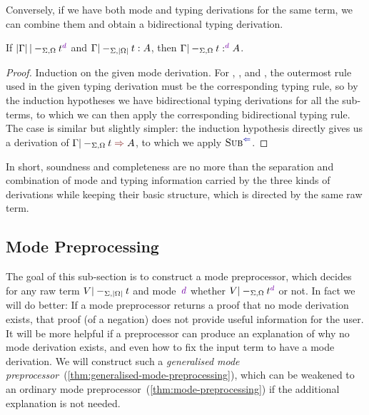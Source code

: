 Conversely, if we have both mode and typing derivations for the same term, we can combine them and obtain a bidirectional typing derivation.

\begin{lemma}[Completeness]\label{thm:completeness}
If\/ $\erase\Gamma |-_{\Sigma, \Omega} t^\dir{d}$ and\/ $\Gamma |-_{\Sigma, \left|\Omega\right|} t : A$, then $\Gamma |-_{\Sigma, \Omega} t :^\dir{d} A$.
\end{lemma}

\begin{proof}
Induction on the given mode derivation.
For , , and , the outermost rule used in the given typing derivation must be the corresponding typing rule, so by the induction hypotheses we have bidirectional typing derivations for all the sub-terms, to which we can then apply the corresponding bidirectional typing rule.
The  case is similar but slightly simpler: the induction hypothesis directly gives us a derivation of $\Gamma |-_{\Sigma,\Omega} t \syn A$, to which we apply $\ChkRule{Sub}$.
\end{proof}

In short, soundness and completeness are no more than the separation and combination of mode and typing information carried by the three kinds of derivations while keeping their basic structure, which is directed by the same raw term.

\subsection{Mode Preprocessing}
\label{sec:mode-preprocessing}

The goal of this sub-section is to construct a mode preprocessor, which decides for any raw term $V |-_{\Sigma,\left|\Omega\right|} t$ and mode~$\dir d$ whether $V |-_{\Sigma,\Omega} t^\dir{d}$ or not.
In fact we will do better:
If a mode preprocessor returns a proof that no mode derivation exists, that proof (of a negation) does not provide useful information for the user.
It will be more helpful if a preprocessor can produce an explanation of why no mode derivation exists, and even how to fix the input term to have a mode derivation.
We will construct such a \emph{generalised mode preprocessor}~(\cref{thm:generalised-mode-preprocessing}), which can be weakened to an ordinary mode preprocessor~(\cref{thm:mode-preprocessing}) if the additional explanation is not needed.

